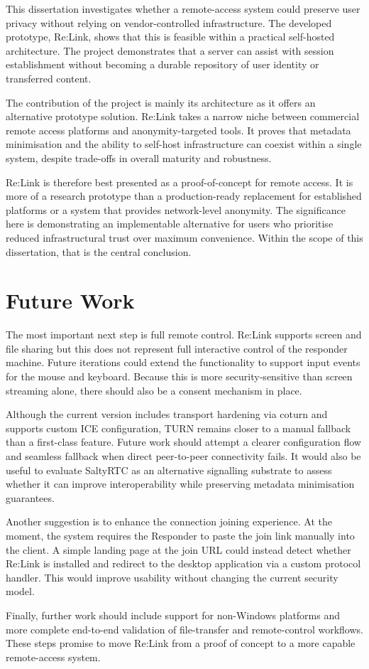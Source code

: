 \documentclass[12pt,a4paper]{article}
\begin{document}
This dissertation investigates whether a remote-access system could preserve user privacy without relying on vendor-controlled infrastructure. The developed prototype, Re:Link, shows that this is feasible within a practical self-hosted architecture. The project demonstrates that a server can assist with session establishment without becoming a durable repository of user identity or transferred content.

The contribution of the project is mainly its architecture as it offers an alternative prototype solution. Re:Link takes a narrow niche between commercial remote access platforms and anonymity-targeted tools. It proves that metadata minimisation and the ability to self-host infrastructure can coexist within a single system, despite trade-offs in overall maturity and robustness.

Re:Link is therefore best presented as a proof-of-concept for remote access. It is more of a research prototype than a production-ready replacement for established platforms or a system that provides network-level anonymity. The significance here is demonstrating an implementable alternative for users who prioritise reduced infrastructural trust over maximum convenience. Within the scope of this dissertation, that is the central conclusion.

\section{Future Work}

The most important next step is full remote control. Re:Link supports screen and file sharing but this does not represent full interactive control of the responder machine. Future iterations could extend the functionality to support input events for the mouse and keyboard. Because this is more security-sensitive than screen streaming alone, there should also be a consent mechanism in place.

Although the current version includes transport hardening via coturn and supports custom ICE configuration, TURN remains closer to a manual fallback than a first-class feature. Future work should attempt a clearer configuration flow and seamless fallback when direct peer-to-peer connectivity fails. It would also be useful to evaluate SaltyRTC \cite{saltyrtc} as an alternative signalling substrate to assess whether it can improve interoperability while preserving metadata minimisation guarantees.

Another suggestion is to enhance the connection joining experience. At the moment, the system requires the Responder to paste the join link manually into the client. A simple landing page at the join URL could instead detect whether Re:Link is installed and redirect to the desktop application via a custom protocol handler. This would improve usability without changing the current security model.

Finally, further work should include support for non-Windows platforms and more complete end-to-end validation of file-transfer and remote-control workflows. These steps promise to move Re:Link from a proof of concept to a more capable remote-access system.



\end{document}

